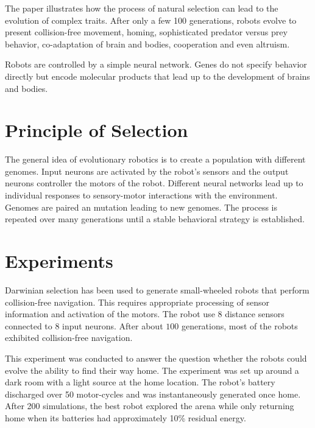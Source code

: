 \documentclass[../main.tex]{subfiles}
\begin{document}
\begin{mdframed}
\end{mdframed}

The paper illustrates how the process of natural selection can lead to the evolution of complex traits. After only a
few 100 generations, robots evolve to present collision-free movement, homing, sophisticated predator versus prey
behavior, co-adaptation of brain and bodies, cooperation and even altruism.

Robots are controlled by a simple neural network. Genes do not specify behavior directly but encode molecular products
that lead up to the development of brains and bodies.

\section{Principle of Selection}

The general idea of evolutionary robotics is to create a population with different genomes. Input neurons are activated
by the robot's sensors and the output neurons controller the motors of the robot. Different neural networks lead up to
individual responses to sensory-motor interactions with the environment. Genomes are paired an mutation leading to new
genomes. The process is repeated over many generations until a stable behavioral strategy is established.

\section{Experiments}

\begin{experiment}
Darwinian selection has been used to generate small-wheeled robots that perform collision-free navigation. This
requires appropriate processing of sensor information and activation of the motors. The robot use 8 distance sensors
connected to 8 input neurons. After about $100$ generations, most of the robots exhibited collision-free navigation.
\end{experiment}

\begin{experiment}
This experiment was conducted to answer the question whether the robots could evolve the ability to find their way
home. The experiment was set up around a dark room with a light source at the home location. The robot's battery
discharged over 50 motor-cycles and was instantaneously generated once home. After 200 simulations, the best robot
explored the arena while only returning home when its batteries had approximately 10\% residual energy.
\end{experiment}
\end{document}
